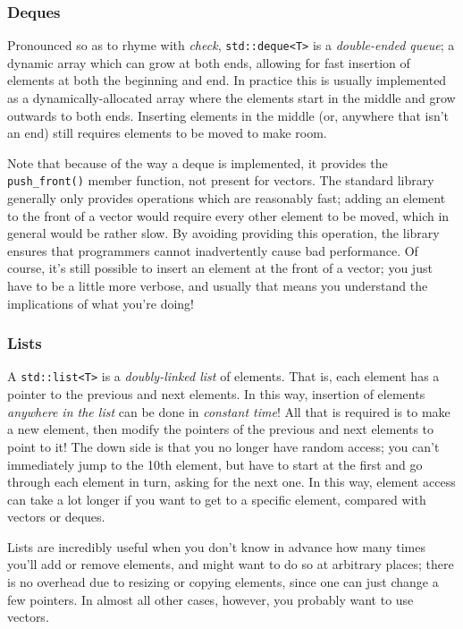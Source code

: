 \documentclass[a4paper]{scrartcl}
\begin{document}
\subsubsection{Deques}\label{sec:containers_sequence_deque}
Pronounced so as to rhyme with \emph{check}, \verb|std::deque<T>| is a \emph{double-ended queue}; a dynamic array which can grow at both ends, allowing for fast insertion of elements at both the beginning and end. In practice this is usually implemented as a dynamically-allocated array where the elements start in the middle and grow outwards to both ends. Inserting elements in the middle (or, anywhere that isn't an end) still requires elements to be moved to make room.

Note that because of the way a deque is implemented, it provides the \verb|push_front()| member function, not present for vectors. The standard library generally only provides operations which are reasonably fast; adding an element to the front of a vector would require every other element to be moved, which in general would be rather slow. By avoiding providing this operation, the library ensures that programmers cannot inadvertently cause bad performance. Of course, it's still possible to insert an element at the front of a vector; you just have to be a little more verbose, and usually that means you understand the implications of what you're doing!

\subsubsection{Lists}\label{sec:containers_sequence_list}
A \verb|std::list<T>| is a \emph{doubly-linked list} of elements. That is, each element has a pointer to the previous and next elements. In this way, insertion of elements \emph{anywhere in the list} can be done in \emph{constant time}! All that is required is to make a new element, then modify the pointers of the previous and next elements to point to it! The down side is that you no longer have random access; you can't immediately jump to the 10th element, but have to start at the first and go through each element in turn, asking for the next one. In this way, element access can take a lot longer if you want to get to a specific element, compared with vectors or deques.

Lists are incredibly useful when you don't know in advance how many times you'll add or remove elements, and might want to do so at arbitrary places; there is no overhead due to resizing or copying elements, since one can just change a few pointers. In almost all other cases, however, you probably want to use vectors.
\end{document}
